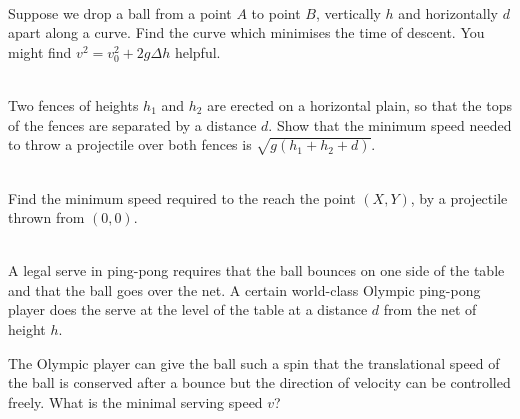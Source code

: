 \begin{exc}
\begin{exercise}[subtitle={River and Drift}, points = 2]
\begin{enumerate}
            \end{enumerate}
        \end{exercise}

        \begin{exercise}[subtitle={Brachistochrone}, points = 4]
            \smallskip
            ~\\
            Suppose we drop a ball from a point $A$ to point $B$, vertically $h$ and horizontally $d$ apart along a 
            curve. Find the curve which minimises the time of descent. You might find $v^2 = v_0^2 + 2g\Delta h$ helpful.
        \end{exercise}


        \begin{exercise}[subtitle={Jumping over Roofs, Kalda}, points = 3]
            \smallskip
            ~\\
            Two fences of heights $h_1$ and $h_2$ are erected on a horizontal plain, so that the tops
            of the fences are separated by a distance $d$. Show that the minimum speed needed to throw a
            projectile over both fences is $\sqrt{g(h_1 + h_2 + d)}$.
            \label{exc: kaldaroof}
        \end{exercise}


        \begin{exercise}[subtitle={Optimal Projectile}, points = 2]
            \smallskip
            ~\\
            Find the minimum speed required to the reach the point $(X, Y)$, by a projectile thrown 
            from $(0, 0)$.
        \end{exercise}
    
        \begin{exercise}[subtitle={Ping Pong 1, OPhO}, points = 3]
            \smallskip
            ~\\
            A legal serve in ping-pong requires that the ball bounces on one side of the table and
            that the ball goes over the net. A certain world-class Olympic ping-pong player does the serve at the level
            of the table at a distance $d$ from the net of height $h$.
            
            The Olympic player can give
            the ball such a spin that the translational speed of the ball is conserved after a bounce but the direction
            of velocity can be controlled freely. What is the minimal serving speed $v$?
        \end{exercise}


\end{exc}
